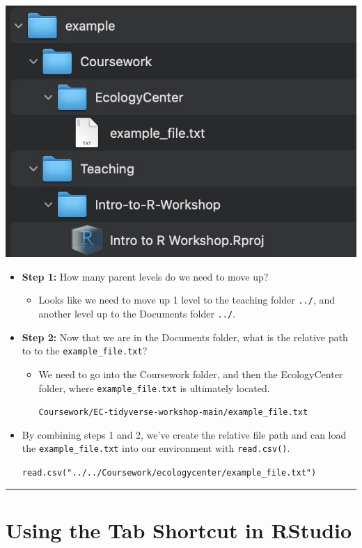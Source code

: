 \documentclass[
]{book}
\providecommand{\tightlist}{%
  \setlength{\itemsep}{0pt}\setlength{\parskip}{0pt}}
\begin{document}
\includegraphics[width=0.5\linewidth,height=\textheight,keepaspectratio]{./docs/files/folder_hierarchy.png}

\begin{itemize}
\item
  \textbf{Step 1:} How many parent levels do we need to move up?

  \begin{itemize}
  \tightlist
  \item
    Looks like we need to move up 1 level to the teaching folder \texttt{../}, and another level up to the Documents folder \texttt{../}.
  \end{itemize}
\item
  \textbf{Step 2:} Now that we are in the Documents folder, what is the relative path to to the \texttt{example\_file.txt}?

  \begin{itemize}
  \item
    We need to go into the Coursework folder, and then the EcologyCenter folder, where
    \texttt{example\_file.txt} is ultimately located.

    \texttt{Coursework/EC-tidyverse-workshop-main/example\_file.txt}
  \end{itemize}
\item
  By combining steps 1 and 2, we've create the relative file path and can load the \texttt{example\_file.txt} into our environment with \texttt{read.csv()}.

  \texttt{read.csv("../../Coursework/ecologycenter/example\_file.txt")}
\end{itemize}

\begin{center}\rule{0.5\linewidth}{0.5pt}\end{center}

\section{Using the Tab Shortcut in RStudio}\label{using-the-tab-shortcut-in-rstudio}
\end{document}
